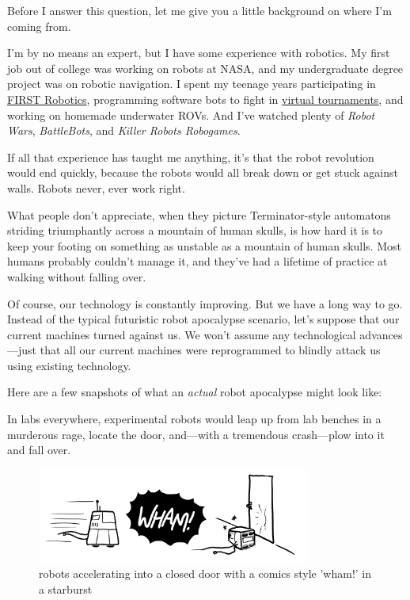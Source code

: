 \hfill{}

{Before I answer this question, let me give you a little background on where I’m coming from.}

{I’m by no means an expert, but I have some experience with robotics. My first job out of college was working on robots at NASA, and my undergraduate degree project was on robotic navigation. I spent my teenage years participating in \href{http://www.usfirst.org/}{FIRST Robotics}, programming software bots to fight in \href{http://en.wikipedia.org/wiki/RoboWar} {virtual tournaments}, and working on homemade underwater ROVs. And I've watched plenty of \emph{Robot Wars}, \emph{BattleBots}, and \emph{Killer Robots Robogames}.}

{If all that experience has taught me anything, it’s that the robot revolution would end quickly, because the robots would all break down or get stuck against walls. Robots never, ever work right.}

{What people don't appreciate, when they picture Terminator-style automatons striding triumphantly across a mountain of human skulls, is how hard it is to keep your footing on something as unstable as a mountain of human skulls. Most humans probably couldn't manage it, and they've had a lifetime of practice at walking without falling over.}

{Of course, our technology is constantly improving. But we have a long way to go. Instead of the typical futuristic robot apocalypse scenario, let's suppose that our current machines turned against us. We won’t assume any technological advances—just that all our current machines were reprogrammed to blindly attack us using existing technology.}

{Here are a few snapshots of what an \emph{actual} robot apocalypse might look like:}

{In labs everywhere, experimental robots would leap up from lab benches in a murderous rage, locate the door, and—with a tremendous crash—plow into it and fall over.}

\begin{figure}[!htbp]
\centering
\includegraphics[scale=0.5, max width=0.8\textwidth]{imgs/a/5/robot_apocalypse_door.png}
\caption{robots accelerating into a closed door with a comics style 'wham!' in a starburst}
\end{figure}


